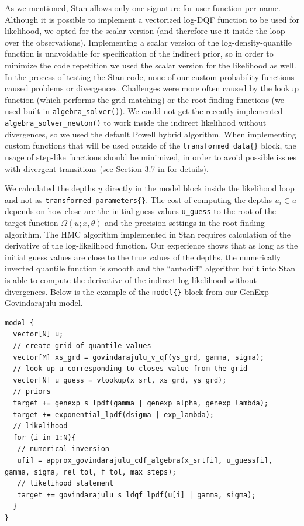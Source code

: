 \documentclass[
  12pt,
]{article}
\begin{document}
As we mentioned, Stan allows only one signature for user function per name. Although it is possible to implement a vectorized log-DQF function to be used for likelihood, we opted for the scalar version (and therefore use it inside the loop over the observations). Implementing a scalar version of the log-density-quantile function is unavoidable for specification of the indirect prior, so in order to minimize the code repetition we used the scalar version for the likelihood as well. In the process of testing the Stan code, none of our custom probability functions caused problems or divergences. Challenges were more often caused by the lookup function (which performs the grid-matching) or the root-finding functions (we used built-in \texttt{algebra\_solver()}). We could not get the recently implemented \texttt{algebra\_solver\_newton()} to work inside the indirect likelihood without divergences, so we used the default Powell hybrid algorithm. When implementing custom functions that will be used outside of the \texttt{transformed\ data\{\}} block, the usage of step-like functions should be minimized, in order to avoid possible issues with divergent transitions (see Section 3.7 in \citet{standevelopmentteam2021StanFunctionsReference} for details).

We calculated the depths \(\underline u\) directly in the model block inside the likelihood loop and not as \texttt{transformed\ parameters\{\}}. The cost of computing the depths \(u_i \in \underline u\) depends on how close are the initial guess values \texttt{u\_guess} to the root of the target function \(\Omega(u;x,\theta)\) and the precision settings in the root-finding algorithm. The HMC algorithm implemented in Stan requires calculation of the derivative of the log-likelihood function. Our experience shows that as long as the initial guess values are close to the true values of the depths, the numerically inverted quantile function is smooth and the ``autodiff'' algorithm built into Stan is able to compute the derivative of the indirect log likelihood without divergences. Below is the example of the \texttt{model\{\}} block from our GenExp-Govindarajulu model.

\begin{verbatim}
model {
  vector[N] u;
  // create grid of quantile values
  vector[M] xs_grd = govindarajulu_v_qf(ys_grd, gamma, sigma);
  // look-up u corresponding to closes value from the grid
  vector[N] u_guess = vlookup(x_srt, xs_grd, ys_grd);
  // priors
  target += genexp_s_lpdf(gamma | genexp_alpha, genexp_lambda);
  target += exponential_lpdf(dsigma | exp_lambda);
  // likelihood
  for (i in 1:N){
   // numerical inversion
   u[i] = approx_govindarajulu_cdf_algebra(x_srt[i], u_guess[i], gamma, sigma, rel_tol, f_tol, max_steps);
   // likelihood statement
   target += govindarajulu_s_ldqf_lpdf(u[i] | gamma, sigma);
  }
}
\end{verbatim}
\end{document}
